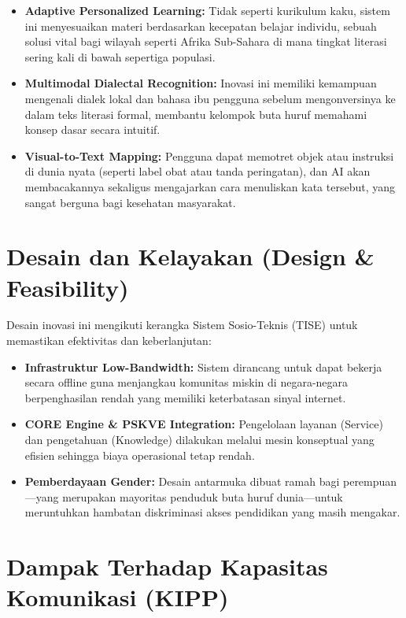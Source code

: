 \documentclass[
  letterpaper,
  DIV=11,
  numbers=noendperiod]{scrreprt}
\begin{document}
\begin{itemize}
\item
  \textbf{Adaptive Personalized Learning:} Tidak seperti kurikulum kaku,
  sistem ini menyesuaikan materi berdasarkan kecepatan belajar individu,
  sebuah solusi vital bagi wilayah seperti Afrika Sub-Sahara di mana
  tingkat literasi sering kali di bawah sepertiga populasi.
\item
  \textbf{Multimodal Dialectal Recognition:} Inovasi ini memiliki
  kemampuan mengenali dialek lokal dan bahasa ibu pengguna sebelum
  mengonversinya ke dalam teks literasi formal, membantu kelompok buta
  huruf memahami konsep dasar secara intuitif.
\item
  \textbf{Visual-to-Text Mapping:} Pengguna dapat memotret objek atau
  instruksi di dunia nyata (seperti label obat atau tanda peringatan),
  dan AI akan membacakannya sekaligus mengajarkan cara menuliskan kata
  tersebut, yang sangat berguna bagi kesehatan masyarakat.
\end{itemize}

\section{Desain dan Kelayakan (Design \&
Feasibility)}\label{desain-dan-kelayakan-design-feasibility}

Desain inovasi ini mengikuti kerangka Sistem Sosio-Teknis (TISE) untuk
memastikan efektivitas dan keberlanjutan:

\begin{itemize}
\item
  \textbf{Infrastruktur Low-Bandwidth:} Sistem dirancang untuk dapat
  bekerja secara offline guna menjangkau komunitas miskin di
  negara-negara berpenghasilan rendah yang memiliki keterbatasan sinyal
  internet.
\item
  \textbf{CORE Engine \& PSKVE Integration:} Pengelolaan layanan
  (Service) dan pengetahuan (Knowledge) dilakukan melalui mesin
  konseptual yang efisien sehingga biaya operasional tetap rendah.
\item
  \textbf{Pemberdayaan Gender:} Desain antarmuka dibuat ramah bagi
  perempuan---yang merupakan mayoritas penduduk buta huruf dunia---untuk
  meruntuhkan hambatan diskriminasi akses pendidikan yang masih
  mengakar.
\end{itemize}

\section{Dampak Terhadap Kapasitas Komunikasi
(KIPP)}\label{dampak-terhadap-kapasitas-komunikasi-kipp}
\end{document}
